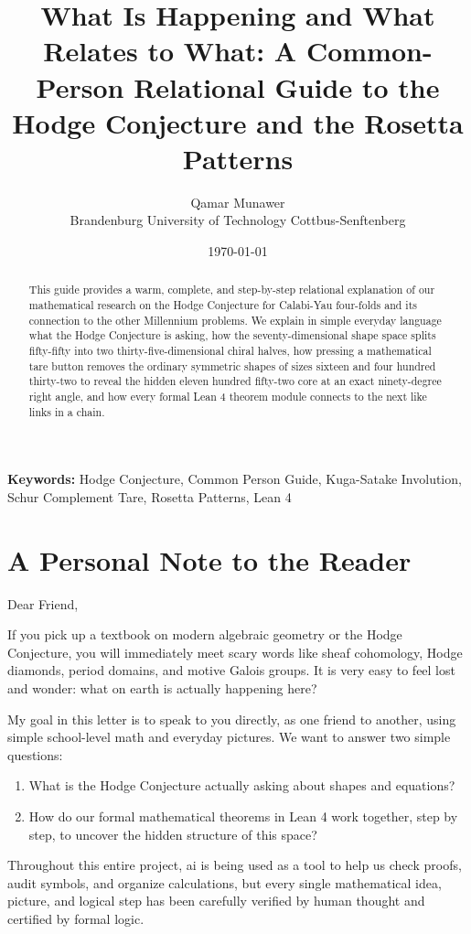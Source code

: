 \documentclass[11pt,a4paper]{article}
\title{\textbf{What Is Happening and What Relates to What: A Common-Person Relational Guide to the Hodge Conjecture and the Rosetta Patterns}}
\author{Qamar Munawer \\ Brandenburg University of Technology Cottbus-Senftenberg}
\date{\today}
\theoremstyle{definition}
\begin{document}
\maketitle

\begin{abstract}
This guide provides a warm, complete, and step-by-step relational explanation of our mathematical research on the Hodge Conjecture for Calabi-Yau four-folds and its connection to the other Millennium problems. We explain in simple everyday language what the Hodge Conjecture is asking, how the seventy-dimensional shape space splits fifty-fifty into two thirty-five-dimensional chiral halves, how pressing a mathematical tare button removes the ordinary symmetric shapes of sizes sixteen and four hundred thirty-two to reveal the hidden eleven hundred fifty-two core at an exact ninety-degree right angle, and how every formal Lean 4 theorem module connects to the next like links in a chain.
\end{abstract}

\vspace{1em}
\noindent\textbf{Keywords:} Hodge Conjecture, Common Person Guide, Kuga-Satake Involution, Schur Complement Tare, Rosetta Patterns, Lean 4


\section{A Personal Note to the Reader}

Dear Friend,

If you pick up a textbook on modern algebraic geometry or the Hodge Conjecture, you will immediately meet scary words like sheaf cohomology, Hodge diamonds, period domains, and motive Galois groups. It is very easy to feel lost and wonder: what on earth is actually happening here?

My goal in this letter is to speak to you directly, as one friend to another, using simple school-level math and everyday pictures. We want to answer two simple questions:
\begin{enumerate}
  \item What is the Hodge Conjecture actually asking about shapes and equations?
  \item How do our formal mathematical theorems in Lean 4 work together, step by step, to uncover the hidden structure of this space?
\end{enumerate}

Throughout this entire project, ai is being used as a tool to help us check proofs, audit symbols, and organize calculations, but every single mathematical idea, picture, and logical step has been carefully verified by human thought and certified by formal logic.
\end{document}
